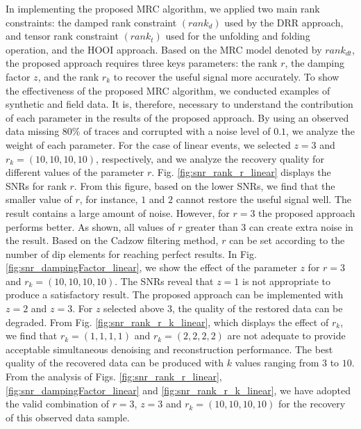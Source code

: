 
In implementing the proposed MRC algorithm, we applied two main rank constraints: the damped rank constraint $(rank_{d})$ used by the DRR approach, and tensor rank constraint $(rank_{t})$ used for the unfolding and folding operation, and the HOOI approach. Based on the MRC model denoted by $rank_{dt}$, the proposed  approach requires three keys parameters: the rank ${r}$, the damping factor ${z}$, and the rank $r_{k}$ to recover the useful signal more accurately. 
To show the effectiveness of the proposed MRC algorithm, we conducted examples of synthetic and field data. It is, therefore, necessary to understand the contribution of each parameter in the results of the proposed  approach. By using an observed data missing $80\%$ of traces and corrupted with a noise level of $0.1$, we analyze the weight of each parameter. For the case of linear events, we selected ${z}=3$ and $r_k=(10,10,10,10)$, respectively, and we analyze the recovery quality for different values of the parameter $r$. Fig. \ref{fig:snr_rank_r_linear} displays the SNRs for rank $r$. From this figure, based on the lower SNRs, we find that the smaller value of ${r}$, for instance, $1$ and $2$ cannot restore the useful signal well. The result contains a large amount of noise. However, for $r =3$ the proposed  approach performs better. As shown, all values of $r$ greater than $3$ can create extra noise in the result. Based on the Cadzow filtering method, $r$ can be set according to the number of dip elements for reaching perfect results. In Fig. \ref{fig:snr_dampingFactor_linear}, we show the effect of the parameter $z$ for ${r}=3$ and $r_k=(10,10,10,10)$. The SNRs reveal that $z=1$ is not appropriate to produce a satisfactory result. The proposed  approach can be implemented with $z=2$ and $z=3$. For $z$ selected above $3$, the quality of the restored data can be degraded. From Fig. \ref{fig:snr_rank_r_k_linear}, which displays the effect of $r_k$, we find that $r_k=(1,1,1,1)$ and $r_k=(2,2,2,2)$ are not adequate to provide acceptable simultaneous denoising and reconstruction performance. The best quality of the recovered data can be produced with $k$ values ranging from $3$ to $10$. From the analysis of Figs. \ref{fig:snr_rank_r_linear}, \ref{fig:snr_dampingFactor_linear} and \ref{fig:snr_rank_r_k_linear}, we have adopted the valid combination of $r=3$, $z=3$ and $r_k=(10,10,10,10)$ for the recovery of this observed data sample.

